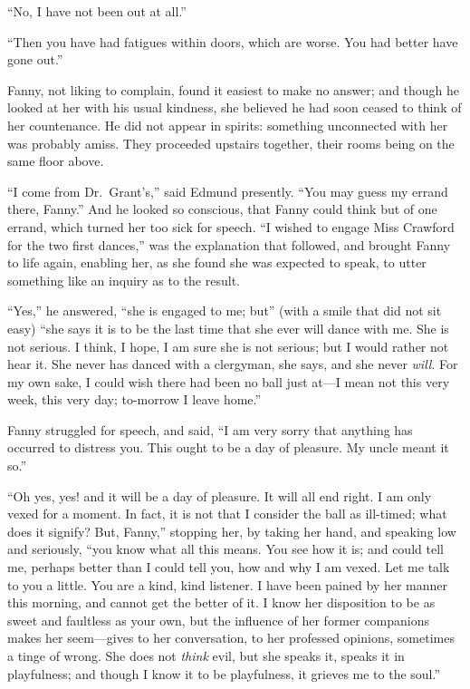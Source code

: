 ``No, I have not been out at all.''

``Then you have had fatigues within doors, which are worse.
You had better have gone out.''

Fanny, not liking to complain, found it easiest to make
no answer; and though he looked at her with his usual kindness,
she believed he had soon ceased to think of her countenance.
He did not appear in spirits:  something unconnected with
her was probably amiss.  They proceeded upstairs together,
their rooms being on the same floor above.

``I come from Dr.\ Grant's,'' said Edmund presently.
``You may guess my errand there, Fanny.''  And he looked
so conscious, that Fanny could think but of one errand,
which turned her too sick for speech.  ``I wished to
engage Miss Crawford for the two first dances,'' was the
explanation that followed, and brought Fanny to life again,
enabling her, as she found she was expected to speak,
to utter something like an inquiry as to the result.

``Yes,'' he answered, ``she is engaged to me; but'' (with a smile
that did not sit easy) ``she says it is to be the last time
that she ever will dance with me.  She is not serious.
I think, I hope, I am sure she is not serious; but I would
rather not hear it.  She never has danced with a clergyman,
she says, and she never \emph{will}.  For my own sake, I could
wish there had been no ball just at---I mean not this
very week, this very day; to-morrow I leave home.''

Fanny struggled for speech, and said, ``I am very sorry
that anything has occurred to distress you.  This ought
to be a day of pleasure.  My uncle meant it so.''

``Oh yes, yes! and it will be a day of pleasure.
It will all end right.  I am only vexed for a moment.
In fact, it is not that I consider the ball as ill-timed;
what does it signify?  But, Fanny,'' stopping her,
by taking her hand, and speaking low and seriously,
``you know what all this means.  You see how it is;
and could tell me, perhaps better than I could tell you,
how and why I am vexed.  Let me talk to you a little.
You are a kind, kind listener.  I have been pained
by her manner this morning, and cannot get the better
of it.  I know her disposition to be as sweet and
faultless as your own, but the influence of her former
companions makes her seem---gives to her conversation,
to her professed opinions, sometimes a tinge of wrong.
She does not \emph{think} evil, but she speaks it, speaks it
in playfulness; and though I know it to be playfulness,
it grieves me to the soul.''

